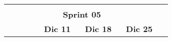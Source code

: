 \begin{longtable}[c]{llclllllllllllllllll}
        \multicolumn{1}{|l|}{}                                                                                                  & \multicolumn{1}{l|}{}                                                          & \multicolumn{1}{l|}{}                                                            & \multicolumn{1}{l|}{}                                                                &                                 &                                 &                                 &                                 &                                 &                                 &                                 &                                 &                                 &                                 &                                 &                                 &                                 &                                 & \multicolumn{1}{l|}{}                         &  \\ \cline{1-19}
        \multicolumn{19}{|c|}{\cellcolor[HTML]{8EA9D8}\textbf{Sprint 05}}                                                                                                                                                                                                                                                                                                                                                                                                                                                                                                                                                                                                                                                                                                                                                                                                                                                              &  \\ \cline{1-19}
        \multicolumn{1}{|c|}{}                                                                                                  & \multicolumn{1}{c|}{}                                                          & \multicolumn{1}{c|}{}                                                            & \multicolumn{1}{c|}{}                                                                & \multicolumn{5}{c|}{\textbf{Dic 11}}                                                                                                                                    & \multicolumn{5}{c|}{\textbf{Dic 18}}                                                                                                                                    & \multicolumn{5}{c|}{\textbf{Dic 25}}                                                                                                                                                  &  \\ \cline{5-19}

\end{longtable}
